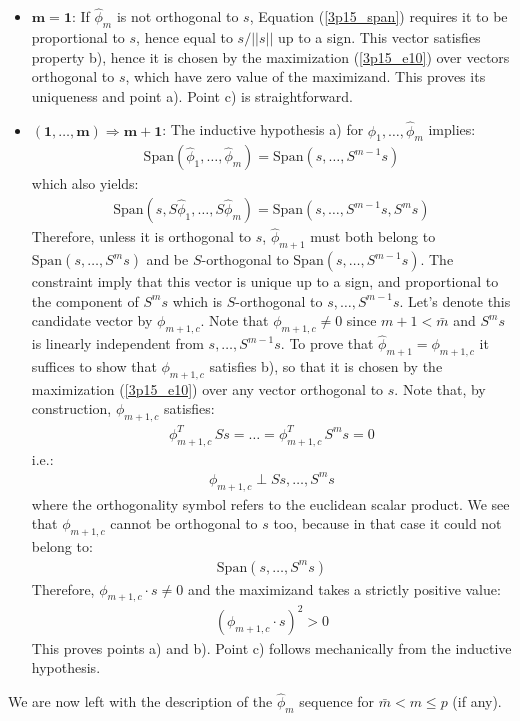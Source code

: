 \begin{itemize}
    \item $\mathbf{m = 1}$: If $\hat{\phi}_m$ is not orthogonal to $s$, Equation (\ref{3p15_span}) requires
    it to be proportional to $s$, hence equal to $s / ||s||$ up to a sign. This vector satisfies
    property b), hence it is chosen by the maximization (\ref{3p15_e10}) over vectors orthogonal to $s$,
    which have zero value of the maximizand. This proves its uniqueness and point a). Point c) is
    straightforward.
    \item $\mathbf{(1, \ldots, m) \Rightarrow m + 1}$: The inductive hypothesis a) for $\hat{\phi}_1, \ldots, \hat{\phi}_m$ implies:
    \begin{eqnarray*}
        \textrm{Span}\left(\hat{\phi}_1, \ldots, \hat{\phi}_m \right) = \textrm{Span} \left( s, \ldots, S^{m - 1}s \right)
    \end{eqnarray*}
    which also yields:
    \begin{eqnarray*}
        \textrm{Span}\left(s, S\hat{\phi}_1, \ldots, S\hat{\phi}_m \right) = \textrm{Span} \left( s, \ldots, S^{m - 1}s, S^m s \right)
    \end{eqnarray*}
    Therefore, unless it is orthogonal to $s$, $\hat{\phi}_{m + 1}$ must both belong to $\textrm{Span} \left( s, \ldots, S^m s \right)$ and be $S$-orthogonal to $\textrm{Span} \left( s, \ldots, S^{m - 1}s \right)$. The constraint imply that this vector is unique up to a sign, and proportional to the component of $S^m s$ which is $S$-orthogonal to $s, \ldots, S^{m - 1}s$. Let's denote this candidate
    vector by $\phi_{m+1,c}$. Note that $\phi_{m+1,c} \neq 0$ since $m + 1 < \bar{m}$ and $S^m s$ is linearly independent from $s, \ldots, S^{m - 1}s$. To prove that $\hat{\phi}_{m + 1} = \phi_{m + 1, c}$ it suffices to show that $\phi_{m + 1, c}$ satisfies b), so that it is chosen by the maximization (\ref{3p15_e10}) over any vector orthogonal to $s$. Note that, by construction, $\phi_{m + 1, c}$ satisfies:
    \begin{eqnarray*}
        \phi_{m + 1, c}^T\, S s = \ldots = \phi_{m + 1, c}^T\, S^{m} s = 0
    \end{eqnarray*}
    i.e.:
    \begin{eqnarray*}
        \phi_{m + 1, c} \perp Ss, \ldots, S^{m} s
    \end{eqnarray*}
    where the orthogonality symbol refers to the euclidean scalar product. We see that $\phi_{m + 1, c}$
    cannot be orthogonal to $s$ too, because in that case it could not belong to:
    \begin{eqnarray*}
        \textrm{Span} \left( s, \ldots, S^m s \right)
    \end{eqnarray*}
    Therefore, $\phi_{m + 1, c} \cdot s \neq 0$ and the maximizand takes a strictly positive value:
    \begin{eqnarray*}
        \left( \phi_{m + 1, c} \cdot s \right)^2 > 0
    \end{eqnarray*}
    This proves points a) and b). Point c) follows mechanically from the inductive hypothesis.
\end{itemize}
We are now left with the description of the $\hat{\phi}_m$ sequence for $\bar{m} < m \leq p$ (if any).

